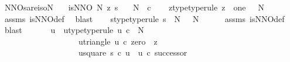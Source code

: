 \begin{isabellebody}
\isamarkupfalse%
\ NNOs{\isacharunderscore}{\kern0pt}are{\isacharunderscore}{\kern0pt}iso{\isacharunderscore}{\kern0pt}N{\isacharcolon}{\kern0pt}\isanewline
\ \ \ {\isachardoublequoteopen}is{\isacharunderscore}{\kern0pt}NNO\ N\ z\ s{\isachardoublequoteclose}\isanewline
\ \ \ {\isachardoublequoteopen}N\ {\isasymcong}\ {\isasymnat}\isactrlsub c{\isachardoublequoteclose}\isanewline
%
\isadelimproof
%
\endisadelimproof
%
\isatagproof
{}\isamarkupfalse%
{\isacharminus}{\kern0pt}\isanewline
\ \ \isamarkupfalse%
\ z{\isacharunderscore}{\kern0pt}type{\isacharbrackleft}{\kern0pt}type{\isacharunderscore}{\kern0pt}rule{\isacharbrackright}{\kern0pt}{\isacharcolon}{\kern0pt}\ {\isachardoublequoteopen}{\isacharparenleft}{\kern0pt}z\ {\isacharcolon}{\kern0pt}\ one\ {\isasymrightarrow}\ \ N{\isacharparenright}{\kern0pt}{\isachardoublequoteclose}\ \isanewline
\ \ \ \ \isamarkupfalse%
\ assms\ is{\isacharunderscore}{\kern0pt}NNO{\isacharunderscore}{\kern0pt}def\ \isamarkupfalse%
\ blast\isanewline
\ \ \isamarkupfalse%
\ s{\isacharunderscore}{\kern0pt}type{\isacharbrackleft}{\kern0pt}type{\isacharunderscore}{\kern0pt}rule{\isacharbrackright}{\kern0pt}{\isacharcolon}{\kern0pt}\ {\isachardoublequoteopen}{\isacharparenleft}{\kern0pt}s\ {\isacharcolon}{\kern0pt}\ N\ {\isasymrightarrow}\ \ N{\isacharparenright}{\kern0pt}{\isachardoublequoteclose}\isanewline
\ \ \ \ \isamarkupfalse%
\ assms\ is{\isacharunderscore}{\kern0pt}NNO{\isacharunderscore}{\kern0pt}def\ \isamarkupfalse%
\ blast\ \isanewline
\ \ \isamarkupfalse%
\ \isamarkupfalse%
\ u\ \ u{\isacharunderscore}{\kern0pt}type{\isacharbrackleft}{\kern0pt}type{\isacharunderscore}{\kern0pt}rule{\isacharbrackright}{\kern0pt}{\isacharcolon}{\kern0pt}\ {\isachardoublequoteopen}u{\isacharcolon}{\kern0pt}\ {\isasymnat}\isactrlsub c\ {\isasymrightarrow}\ N{\isachardoublequoteclose}\ \isanewline
\ \ \ \ \ \ \ \ \ \ \ \ \ \ \ \ \ \ \ u{\isacharunderscore}{\kern0pt}triangle{\isacharcolon}{\kern0pt}\ {\isachardoublequoteopen}u\ {\isasymcirc}\isactrlsub c\ zero\ {\isacharequal}{\kern0pt}\ z{\isachardoublequoteclose}\ \isanewline
\ \ \ \ \ \ \ \ \ \ \ \ \ \ \ \ \ \ \ u{\isacharunderscore}{\kern0pt}square{\isacharcolon}{\kern0pt}\ {\isachardoublequoteopen}s\ {\isasymcirc}\isactrlsub c\ u\ {\isacharequal}{\kern0pt}\ u\ {\isasymcirc}\isactrlsub c\ successor{\isachardoublequoteclose}\isanewline

\end{isabellebody}
